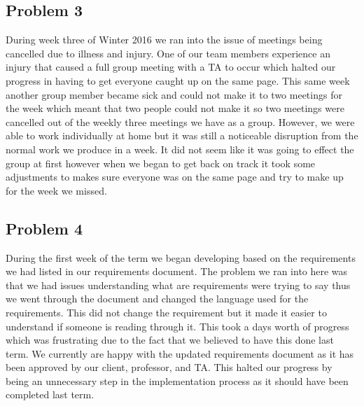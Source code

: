 \documentclass[draftclsnofoot,10pt,onecolumn]{IEEEtran} %
\begin{document}
\subsection{Problem 3}
During week three of Winter 2016 we ran into the issue of meetings being
cancelled due to illness and injury. One of our team members experience an injury
that caused a full group meeting with a TA to occur which halted our progress in
having to get everyone caught up on the same page. This same week another group
member became sick and could not make it to two meetings for the week which
meant that two people could not make it so two meetings were cancelled out of the
weekly three meetings we have as a group. However, we were
able to work individually at home but it was still a noticeable disruption from
the normal work we produce in a week. It did not seem like it was going to
effect the group at first however when we began to get back on track it took
some adjustments to makes sure everyone was on the same page and try to make up
for the week we missed.

\subsection{Problem 4}
During the first week of the term we began developing based on the requirements
we had listed in our requirements document. The problem we ran into here was
that we had issues understanding what are requirements were trying to say thus
we went through the document and changed the language used for the requirements.
This did not change the requirement but it made it easier to understand if
someone is reading through it. This took a days worth of progress which was
frustrating due to the fact that we believed to have this done last term. We
currently are happy with the updated requirements document as it has been
approved by our client, professor, and TA. This halted our progress by being an
unnecessary step in the implementation process as it should have been completed
last term.
\end{document}
